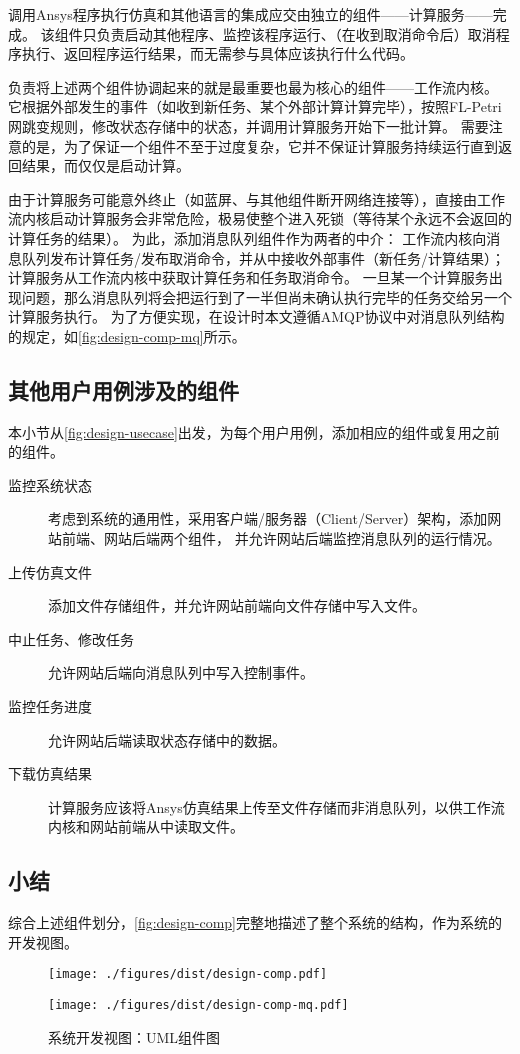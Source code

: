 \documentclass[index]{subfiles}
\begin{document}
调用Ansys程序执行仿真和其他语言的集成应交由独立的组件——计算服务——完成。
该组件只负责启动其他程序、监控该程序运行、（在收到取消命令后）取消程序执行、返回程序运行结果，而无需参与具体应该执行什么代码。

负责将上述两个组件协调起来的就是最重要也最为核心的组件——工作流内核。
它根据外部发生的事件（如收到新任务、某个外部计算计算完毕），按照FL-Petri网跳变规则，修改状态存储中的状态，并调用计算服务开始下一批计算。
需要注意的是，为了保证一个组件不至于过度复杂，它并不保证计算服务持续运行直到返回结果，而仅仅是启动计算。

由于计算服务可能意外终止（如蓝屏、与其他组件断开网络连接等），直接由工作流内核启动计算服务会非常危险，极易使整个进入死锁（等待某个永远不会返回的计算任务的结果）。
为此，添加消息队列组件作为两者的中介：
工作流内核向消息队列发布计算任务/发布取消命令，并从中接收外部事件（新任务/计算结果）；
计算服务从工作流内核中获取计算任务和任务取消命令。
一旦某一个计算服务出现问题，那么消息队列将会把运行到了一半但尚未确认执行完毕的任务交给另一个计算服务执行。
为了方便实现，在设计时本文遵循AMQP协议中对消息队列结构的规定，如\cref{fig:design-comp-mq}所示。

\subsection{其他用户用例涉及的组件}
本小节从\cref{fig:design-usecase}出发，为每个用户用例，添加相应的组件或复用之前的组件。
\begin{description}
  \item[监控系统状态] 考虑到系统的通用性，采用客户端/服务器（Client/Server）架构，添加网站前端、网站后端两个组件，
    并允许网站后端监控消息队列的运行情况。
  \item[上传仿真文件] 添加文件存储组件，并允许网站前端向文件存储中写入文件。
  \item[中止任务、修改任务] 允许网站后端向消息队列中写入控制事件。
  \item[监控任务进度] 允许网站后端读取状态存储中的数据。
  \item[下载仿真结果] 计算服务应该将Ansys仿真结果上传至文件存储而非消息队列，以供工作流内核和网站前端从中读取文件。
\end{description}

\subsection{小结}
综合上述组件划分，\cref{fig:design-comp}完整地描述了整个系统的结构，作为系统的开发视图。
\begin{figure}[h]
  \centering%
    {\texttt{[image: ./figures/dist/design-comp.pdf]}}\par
    {\texttt{[image: ./figures/dist/design-comp-mq.pdf]}}
  \caption{系统开发视图：UML组件图}
\end{figure}
\end{document}

